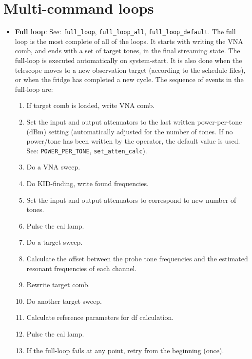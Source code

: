 \section{Multi-command loops}
\begin{itemize}[leftmargin=*,label={}]

\item \textbf{Full loop}: See: \texttt{full\_loop}, \texttt{full\_loop\_all}, \texttt{full\_loop\_default}. The full loop is the most complete of all of the loops. It starts with writing the VNA comb, and ends with a set of target tones, in the final streaming state. The full-loop is executed automatically on system-start. It is also done when the telescope moves to a new observation target (according to the schedule files), or when the fridge has completed a new cycle. The sequence of events in the full-loop are:
\begin{enumerate}
  \item If target comb is loaded, write VNA comb.
  \item Set the input and output attenuators to the last written power-per-tone (dBm) setting (automatically adjusted for the number of tones. If no power/tone has been written by the operator, the default value is used. See: \texttt{POWER\_PER\_TONE}, \texttt{set\_atten\_calc}).
  \item Do a VNA sweep.
  \item Do KID-finding, write found frequencies.
  \item Set the input and output attenuators to correspond to new number of tones.
  \item Pulse the cal lamp.
  \item Do a target sweep.
  \item Calculate the offset between the probe tone frequencies and the estimated resonant frequencies of each channel.
  \item Rewrite target comb.
  \item Do another target sweep.
  \item Calculate reference parameters for df calculation.
  \item Pulse the cal lamp.
  \item If the full-loop fails at any point, retry from the beginning (once).
\end{enumerate}


\end{itemize}
